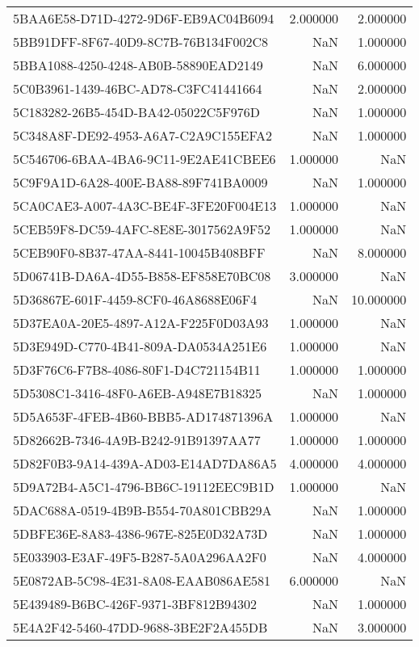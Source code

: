 \begin{tabular}{lrr}
5BAA6E58-D71D-4272-9D6F-EB9AC04B6094 & 2.000000 & 2.000000 \\
5BB91DFF-8F67-40D9-8C7B-76B134F002C8 & NaN & 1.000000 \\
5BBA1088-4250-4248-AB0B-58890EAD2149 & NaN & 6.000000 \\
5C0B3961-1439-46BC-AD78-C3FC41441664 & NaN & 2.000000 \\
5C183282-26B5-454D-BA42-05022C5F976D & NaN & 1.000000 \\
5C348A8F-DE92-4953-A6A7-C2A9C155EFA2 & NaN & 1.000000 \\
5C546706-6BAA-4BA6-9C11-9E2AE41CBEE6 & 1.000000 & NaN \\
5C9F9A1D-6A28-400E-BA88-89F741BA0009 & NaN & 1.000000 \\
5CA0CAE3-A007-4A3C-BE4F-3FE20F004E13 & 1.000000 & NaN \\
5CEB59F8-DC59-4AFC-8E8E-3017562A9F52 & 1.000000 & NaN \\
5CEB90F0-8B37-47AA-8441-10045B408BFF & NaN & 8.000000 \\
5D06741B-DA6A-4D55-B858-EF858E70BC08 & 3.000000 & NaN \\
5D36867E-601F-4459-8CF0-46A8688E06F4 & NaN & 10.000000 \\
5D37EA0A-20E5-4897-A12A-F225F0D03A93 & 1.000000 & NaN \\
5D3E949D-C770-4B41-809A-DA0534A251E6 & 1.000000 & NaN \\
5D3F76C6-F7B8-4086-80F1-D4C721154B11 & 1.000000 & 1.000000 \\
5D5308C1-3416-48F0-A6EB-A948E7B18325 & NaN & 1.000000 \\
5D5A653F-4FEB-4B60-BBB5-AD174871396A & 1.000000 & NaN \\
5D82662B-7346-4A9B-B242-91B91397AA77 & 1.000000 & 1.000000 \\
5D82F0B3-9A14-439A-AD03-E14AD7DA86A5 & 4.000000 & 4.000000 \\
5D9A72B4-A5C1-4796-BB6C-19112EEC9B1D & 1.000000 & NaN \\
5DAC688A-0519-4B9B-B554-70A801CBB29A & NaN & 1.000000 \\
5DBFE36E-8A83-4386-967E-825E0D32A73D & NaN & 1.000000 \\
5E033903-E3AF-49F5-B287-5A0A296AA2F0 & NaN & 4.000000 \\
5E0872AB-5C98-4E31-8A08-EAAB086AE581 & 6.000000 & NaN \\
5E439489-B6BC-426F-9371-3BF812B94302 & NaN & 1.000000 \\
5E4A2F42-5460-47DD-9688-3BE2F2A455DB & NaN & 3.000000 \\

\end{tabular}
